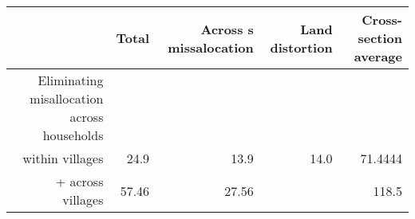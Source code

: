 \begin{tabular}{rrrrr}
  \hline
   & \textbf{Total} & \textbf{Across s missalocation} & \textbf{Land distortion} & \textbf{Cross-section average} \\\hline
  Eliminating misallocation across households &  &  &  &  \\
  within villages & 24.9 & 13.9 & 14.0 & 71.4444 \\
  + across villages & 57.46 & 27.56 &  & 118.5 \\\hline
\end{tabular}